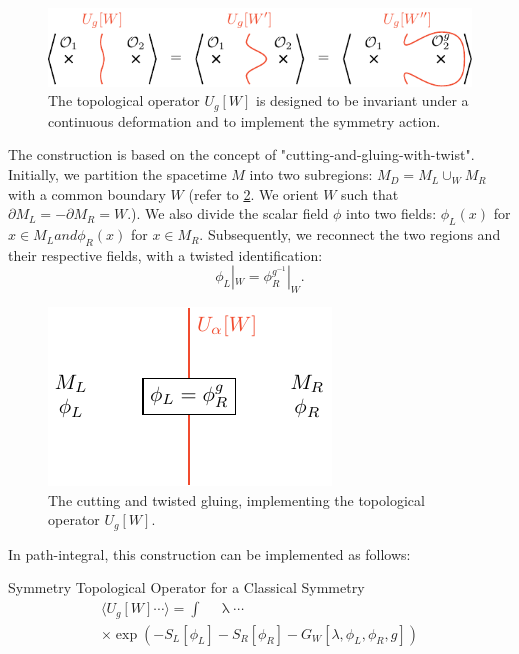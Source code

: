 \documentclass[11pt,toc=bibliography]{scrbook}
\newcommand{\stdim}{D}
\numberwithin{equation}{section}
\begin{document}
\begin{figure}[ht]
\centering
\includegraphics[width=\textwidth]{figures/tikz/Op_action.pdf}
\caption{The topological operator $U_g[W]$ is designed to be invariant under a continuous deformation and to implement the symmetry action.}
\label{fig-op-action}
\end{figure}

The construction is based on the concept of "cutting-and-gluing-with-twist".
Initially, we partition the spacetime $M$ into two subregions: $M_\stdim = M_L \cup_W M_R$ with a common boundary $W$ (refer to \ref{fig-cut-M}. We orient $W$ such that $\partial M_L = -\partial M_R = W$.).
We also divide the scalar field $\phi$ into two fields: $\phi_L(x)$ for $x \in M_L and \phi_R(x)$ for $x \in M_R$. Subsequently, we reconnect the two regions and their respective fields, with a twisted identification: 
\begin{equation}
\phi_L|_W = \phi_R^{g^{-1}}|_W.
\end{equation}

\begin{figure}[ht]
\centering
\includegraphics[width=.4\textwidth]{figures/tikz/ManifoldSplit.pdf}
\caption{The cutting and twisted gluing, implementing the topological operator $U_g[W]$.}
\label{fig-cut-M}
\end{figure}

In path-integral, this construction can be implemented as follows:

\begin{important}
{Symmetry Topological Operator for a Classical Symmetry}
\begin{equation}
\begin{multlined}
    \langle U_g[W] \cdots \rangle = \int \mathop{\mathcal{D}^{M_L}\phi_L} \mathop{\mathcal{D}^{M_R}\phi_R} \mathop{\mathcal{D}^W\lambda} \cdots\\ \times \exp\left(-S_L[\phi_L]-S_R[\phi_R] - G_W[\lambda,\phi_L,\phi_R,g]\right)
\end{multlined}
\label{eq-Ug-pathintegral}
\end{equation}
\end{important}
\end{document}
